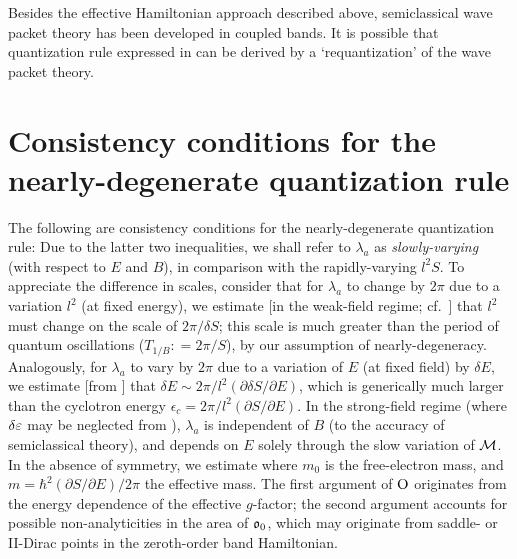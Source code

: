 \documentclass[aps, prb, showpacs, twocolumn, notitlepage, superscriptaddress]{revtex4-1}
\begin{document}
Besides the effective Hamiltonian approach described above, semiclassical wave packet theory has been developed in coupled bands\cite{culcer_coherent_2005}. It is possible that quantization rule expressed in  can be derived by a `requantization' of the wave packet theory\cite{xiao_berry_2010}.  

\section{Consistency conditions for the nearly-degenerate quantization rule}\label{sec:slowvariation}

The following are consistency conditions for the nearly-degenerate quantization rule:
Due to the latter two inequalities, we shall refer to $\lambda_{a}$ as \textit{slowly-varying} (with respect to $E$ and $B$), in comparison with the rapidly-varying $l^2S$. To appreciate the difference in scales, consider that for $\lambda_a$ to change by $2\pi$ due to a variation $l^2$ (at fixed energy), we estimate [in the weak-field regime; cf.\ ] that $l^2$ must change on the scale of $2\pi/\delta S$; this scale is much greater than the period of quantum oscillations ($T_{1/B}{:}{=}2\pi/ S$), by our assumption of nearly-degeneracy. Analogously, for $\lambda_a$ to vary by $2\pi$ due to a variation of $E$ (at fixed field) by $\delta E$, we estimate [from ] that $\delta E {\sim} 2\pi/l^2 (\partial \delta S/\partial E)$, which is generically much larger than the cyclotron energy $\epsilon_c{=}2\pi/l^2 (\partial  S/\partial E)$. In the strong-field regime (where $\delta \varepsilon$ may be neglected from ), $\lambda_a$ is independent of $B$ (to the accuracy of semiclassical theory), and depends on $E$ solely through the slow variation of ${\cal M}$.  In the absence of symmetry, we estimate 
where $m_0$ is the free-electron mass, and $m{=}\hbar^2(\partial S/\partial E)/2\pi$ the effective mass. The first argument of $\text{O}$ originates from the energy dependence of the effective $g$-factor; the second argument accounts for possible non-analyticities in the area of $\mathfrak{o}_0$, which may originate from saddle- or II-Dirac points in the zeroth-order band Hamiltonian.
\end{document}
